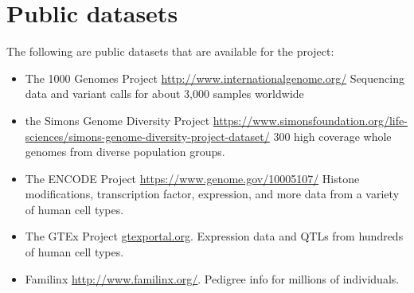 \documentclass[12pt]{article}
\begin{document}
\section*{Public datasets}

The following are public datasets that are available for the project:
\begin{itemize}
	\item The 1000 Genomes Project \href{http://www.internationalgenome.org/}{http://www.internationalgenome.org/} Sequencing data and variant calls for about 3,000 samples worldwide
	\item the Simons Genome Diversity Project \href{https://www.simonsfoundation.org/life-sciences/simons-genome-diversity-project-dataset/}{https://www.simonsfoundation.org/life-sciences/simons-genome-diversity-project-dataset/} 300 high coverage whole genomes from diverse population groups. 
	\item The ENCODE Project \href{https://www.genome.gov/10005107/}{https://www.genome.gov/10005107/} Histone modifications, transcription factor, expression, and more data from a variety of human cell types.
	\item The GTEx Project \href{gtexportal.org}{gtexportal.org}. Expression data and QTLs from hundreds of human cell types.
	\item Familinx \href{http://www.familinx.org/}{http://www.familinx.org/}. Pedigree info for millions of individuals.
\end{itemize}
\end{document}
